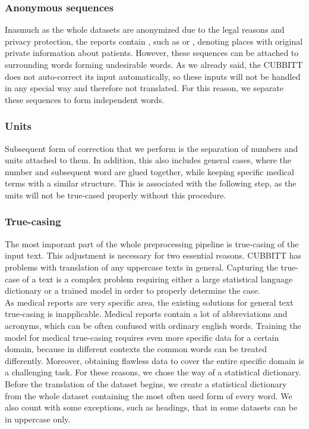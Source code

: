 \subsubsection*{Anonymous sequences}
Inasmuch as the whole datasets are anonymized due to the legal reasons and privacy protection, the reports contain , such as  or \qq{\underline{{ }{ }{ }{ }{ }}}, denoting places with original private information about patients. However, these sequences can be attached to surrounding words forming undesirable words. As we already said, the CUBBITT does not auto-correct its input automatically, so these inputs will not be handled in any special way and therefore not translated. For this reason, we separate these sequences to form independent words.

\subsubsection*{Units}
Subsequent form of correction that we perform is the separation of numbers and units attached to them. In addition, this also includes general cases, where the number and subsequent word are glued together, while keeping specific medical terms with a similar structure. This is associated with the following step, as the units will not be true-cased properly without this procedure.

\subsubsection*{True-casing}
The most imporant part of the whole preprocessing pipeline is true-casing of the input text. This adjustment is necessary for two essential reasons. CUBBITT has problems with translation of any uppercase texts in general. Capturing the true-case of a text is a complex problem requiring either a large statistical language dictionary or a trained model in order to properly determine the case.\\

As medical reports are very specific area, the existing solutions for general text true-casing is inapplicable. Medical reports contain a lot of abbreviations and acronyms, which can be often confused with ordinary english words. Training the model for medical true-casing requires even more specific data for a certain domain, because in different contexts the common words can be treated differently. Moreover, obtaining flawless data to cover the entire specific domain is a challenging task. For these reasons, we chose the way of a statistical dictionary. Before the translation of the dataset begins, we create a statistical dictionary from the whole dataset containing the most often used form of every word. We also count with some exceptions, such as headings, that in some datasets can be in uppercase only.\\

